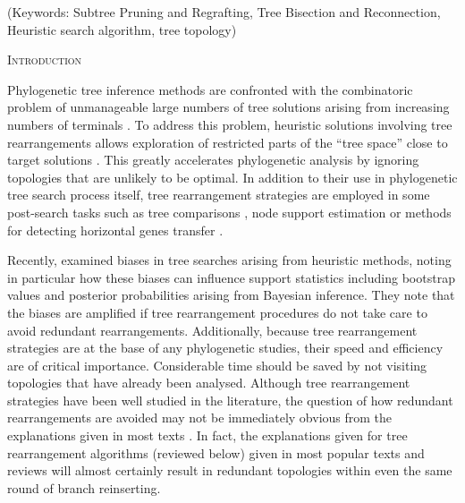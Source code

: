 \documentclass[12pt,letterpaper]{article}
\renewcommand{\section}[1]{%
\bigskip
\begin{center}
\begin{Large}
\normalfont\scshape #1
\medskip
\end{Large}
\end{center}}
\begin{document}
\noindent (Keywords: Subtree Pruning and Regrafting, Tree Bisection and Reconnection, Heuristic search algorithm, tree topology)\\

\vspace{1.5in}

\newpage 

%
%
\section{Introduction}

Phylogenetic tree inference methods are confronted with the combinatoric problem of unmanageable large numbers of tree solutions arising from increasing numbers of terminals \citep{Felsenstein:1978vh}.
To address this problem, heuristic solutions involving tree rearrangements allows exploration of restricted parts of the ``tree space'' close to target solutions \citep{john2016review}.
This greatly accelerates phylogenetic analysis by ignoring topologies that are unlikely to be optimal.
In addition to their use in phylogenetic tree search process itself, tree rearrangement strategies are employed in some post-search tasks such as tree comparisons \citep[e.g.][]{allen2001subtree,kuhner2015treComparison}, node support estimation \citep[e.g.][]{goloboff2014bias} or methods for detecting horizontal genes transfer \citep[e.g.][]{mcfadden1995something,bordewich2005computational}.

Recently, \citet{goloboff2014bias} examined biases in tree searches arising from heuristic methods, noting in particular how these biases can influence support statistics including bootstrap values and posterior probabilities arising from Bayesian inference.
They note that the biases are amplified if tree rearrangement %
procedures do not take care to avoid redundant rearrangements. %
Additionally, because tree rearrangement strategies are at the base of any phylogenetic studies, their speed and efficiency are of critical importance.
Considerable time should be saved by not visiting topologies that have already been analysed.
Although tree rearrangement strategies have been well studied in the literature, the question of how redundant rearrangements are avoided may not be immediately obvious from the explanations given in most texts \citep{swofford2003phylogeny,felsenstein2004inferring,wiley2011phylogenetics}.
In fact, the explanations given for tree rearrangement algorithms (reviewed below) given in most popular texts and reviews will almost certainly result in redundant topologies within even the same round of branch reinserting.
\end{document}
